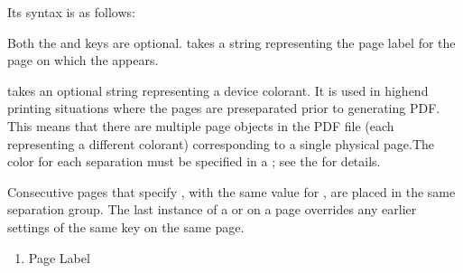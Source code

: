\documentclass[letterpaper,12pt,english,openany,oneside]{sphinxmanual}
\begin{document}
Its syntax is as follows:

\begin{sphinxVerbatim}[commandchars=\\\{\}]
 \PYG{p}{[} 


         
\end{sphinxVerbatim}

Both the  and  keys are optional.  takes a string representing the page label for the page on which the  appears.

 takes an optional string representing a device colorant. It is used in high\sphinxhyphen{}end printing situations where the pages are pre\sphinxhyphen{}separated prior to generating PDF. This means that there are multiple page objects in the PDF file (each representing a different colorant) corresponding to a single physical page.The color for each separation must be specified in a  ; see the  for details.

Consecutive pages that specify  , with the same value for  , are placed in the same separation group. The last instance of a  or  on a page overrides any earlier settings of the same key on the same page.
\begin{enumerate}
%
\item {} 
Page Label

\end{enumerate}

\begin{sphinxVerbatim}[commandchars=\\\{\}]
  
 
\PYG{p}{[}      

  
\PYG{p}{[}    
\end{sphinxVerbatim}
\end{document}
